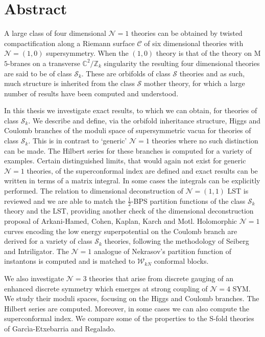 \newpage
\thispagestyle{empty}
\mbox{}

\newpage
\thispagestyle{empty}

\newpage

\nonfrenchspacing
\section*{Abstract}
\onehalfspacing 
{\normalsize A large class of four dimensional $\mathcal{N}=1$ theories can be obtained by twisted compactification along a Riemann surface $\mathcal{C}$ of six dimensional theories with $\mathcal{N}=(1,0)$ supersymmetry. When the $(1,0)$ theory is that of the theory on M$5$-branes on a transverse $\mathbb{C}^2/\mathbb{Z}_k$ singularity the resulting four dimensional theories are said to be of class $\mathcal{S}_k$. These are orbifolds of class $\mathcal{S}$ theories and as such, much structure is inherited from the class $\mathcal{S}$ mother theory, for which a large number of results have been computed and understood. 

In this thesis we investigate exact results, to which we can obtain, for theories of class $\mathcal{S}_k$. We describe and define, via the orbifold inheritance structure, Higgs and Coulomb branches of the moduli space of supersymmetric vacua for theories of class $\mathcal{S}_k$. This is in contrast to `generic' $\mathcal{N}=1$ theories where no such distinction can be made. The Hilbert series for these branches is computed for a variety of examples. Certain distinguished limits, that would again not exist for generic $\mathcal{N}=1$ theories, of the superconformal index are defined and exact results can be written in terms of a matrix integral. In some cases the integrals can be explicitly performed. The relation to dimensional deconstruction of $\mathcal{N}=(1,1)$ LST is reviewed and we are able to match the $\frac{1}{2}$-BPS partition functions of the class $\mathcal{S}_k$ theory and the LST, providing another check of the dimensional deconstruction proposal of Arkani-Hamed, Cohen, Kaplan, Karch and Motl. Holomorphic $\mathcal{N}=1$ curves encoding the low energy superpotential on the Coulomb branch are derived for a variety of class $\mathcal{S}_k$ theories, following the methodology of Seiberg and Intriligator. The $\mathcal{N}=1$ analogue of Nekrasov's partition function of instantons is computed and is matched to $\mathcal{W}_{kN}$ conformal blocks.

We also investigate $\mathcal{N}=3$ theories that arise from discrete gauging of an enhanced discrete symmetry which emerges at strong coupling of $\mathcal{N}=4$ SYM. We study their moduli spaces, focusing on the Higgs and Coulomb branches. The Hilbert series are computed. Moreover, in some cases we can also compute the superconformal index. We compare some of the properties to the S-fold theories of Garc\`ia-Etxebarria and Regalado.

}
